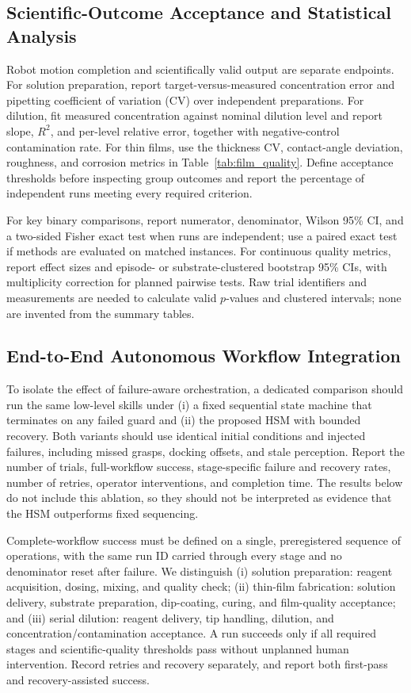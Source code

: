 \subsection{Scientific-Outcome Acceptance and Statistical Analysis}
\label{subsec:science_quality_stats}
Robot motion completion and scientifically valid output are separate endpoints. For solution preparation, report target-versus-measured concentration error and pipetting coefficient of variation (CV) over independent preparations. For dilution, fit measured concentration against nominal dilution level and report slope, $R^2$, and per-level relative error, together with negative-control contamination rate. For thin films, use the thickness CV, contact-angle deviation, roughness, and corrosion metrics in Table~\ref{tab:film_quality}. Define acceptance thresholds before inspecting group outcomes and report the percentage of independent runs meeting every required criterion.

For key binary comparisons, report numerator, denominator, Wilson 95\% CI, and a two-sided Fisher exact test when runs are independent; use a paired exact test if methods are evaluated on matched instances. For continuous quality metrics, report effect sizes and episode- or substrate-clustered bootstrap 95\% CIs, with multiplicity correction for planned pairwise tests. Raw trial identifiers and measurements are needed to calculate valid $p$-values and clustered intervals; none are invented from the summary tables.

\subsection{End-to-End Autonomous Workflow Integration}
\label{subsec:exp_end_to_end}

To isolate the effect of failure-aware orchestration, a dedicated comparison should run the same low-level skills under (i) a fixed sequential state machine that terminates on any failed guard and (ii) the proposed HSM with bounded recovery. Both variants should use identical initial conditions and injected failures, including missed grasps, docking offsets, and stale perception. Report the number of trials, full-workflow success, stage-specific failure and recovery rates, number of retries, operator interventions, and completion time. The results below do not include this ablation, so they should not be interpreted as evidence that the HSM outperforms fixed sequencing.

Complete-workflow success must be defined on a single, preregistered sequence of operations, with the same run ID carried through every stage and no denominator reset after failure. We distinguish (i) solution preparation: reagent acquisition, dosing, mixing, and quality check; (ii) thin-film fabrication: solution delivery, substrate preparation, dip-coating, curing, and film-quality acceptance; and (iii) serial dilution: reagent delivery, tip handling, dilution, and concentration/contamination acceptance. A run succeeds only if all required stages and scientific-quality thresholds pass without unplanned human intervention. Record retries and recovery separately, and report both first-pass and recovery-assisted success.

